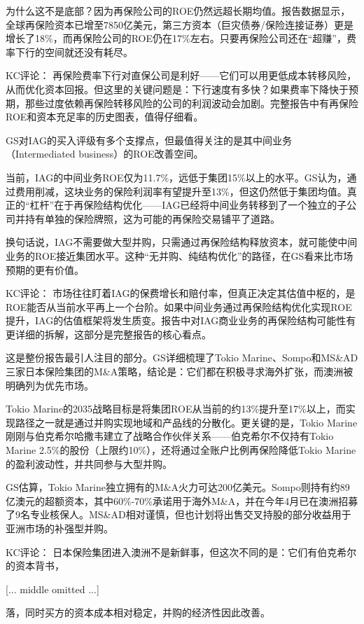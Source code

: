 \documentclass[11pt]{ctexart}
\begin{document}
为什么这不是底部？因为再保险公司的ROE仍然远超长期均值。报告数据显示，全球再保险资本已增至7850亿美元，第三方资本（巨灾债券/保险连接证券）更是增长了18\%，而再保险公司的ROE仍在17\%左右。只要再保险公司还在“超赚”，费率下行的空间就还没有耗尽。

KC评论： 再保险费率下行对直保公司是利好——它们可以用更低成本转移风险，从而优化资本回报。但这里的关键问题是：下行速度有多快？如果费率下降快于预期，那些过度依赖再保险转移风险的公司的利润波动会加剧。完整报告中有再保险ROE和资本充足率的历史图表，值得仔细看。

GS对IAG的买入评级有多个支撑点，但最值得关注的是其中间业务（Intermediated business）的ROE改善空间。

当前，IAG的中间业务ROE仅为11.7\%，远低于集团15\%以上的水平。GS认为，通过费用削减，这块业务的保险利润率有望提升至13\%，但这仍然低于集团均值。真正的“杠杆”在于再保险结构优化——IAG已经将中间业务转移到了一个独立的子公司并持有单独的保险牌照，这为可能的再保险交易铺平了道路。

换句话说，IAG不需要做大型并购，只需通过再保险结构释放资本，就可能使中间业务的ROE接近集团水平。这种“无并购、纯结构优化”的路径，在GS看来比市场预期的更有价值。

KC评论： 市场往往盯着IAG的保费增长和赔付率，但真正决定其估值中枢的，是ROE能否从当前水平再上一个台阶。如果中间业务通过再保险结构优化实现ROE提升，IAG的估值框架将发生质变。报告中对IAG商业业务的再保险结构可能性有更详细的拆解，这部分是完整报告的核心看点。

这是整份报告最引人注目的部分。GS详细梳理了Tokio Marine、Sompo和MS\&AD三家日本保险集团的M\&A策略，结论是：它们都在积极寻求海外扩张，而澳洲被明确列为优先市场。

Tokio Marine的2035战略目标是将集团ROE从当前的约13\%提升至17\%以上，而实现路径之一就是通过并购实现地域和产品线的分散化。更关键的是，Tokio Marine刚刚与伯克希尔哈撒韦建立了战略合作伙伴关系——伯克希尔不仅持有Tokio Marine 2.5\%的股份（上限约10\%），还将通过全账户比例再保险降低Tokio Marine的盈利波动性，并共同参与大型并购。

GS估算，Tokio Marine独立拥有的M\&A火力可达200亿美元。Sompo则持有约89亿澳元的超额资本，其中60\%-70\%承诺用于海外M\&A，并在今年4月已在澳洲招募了9名专业核保人。MS\&AD相对谨慎，但也计划将出售交叉持股的部分收益用于亚洲市场的补强型并购。

KC评论： 日本保险集团进入澳洲不是新鲜事，但这次不同的是：它们有伯克希尔的资本背书，

[... middle omitted ...]

落，同时买方的资本成本相对稳定，并购的经济性因此改善。
\end{document}
